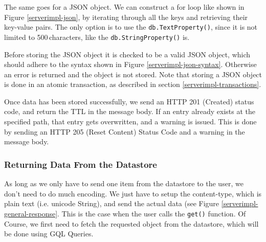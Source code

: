 The same goes for a JSON object. We can construct a for loop like shown in Figure
\ref{serverimpl-json}, by iterating through all the keys and retrieving their
key-value pairs. The only option is to use the \texttt{db.TextProperty()}, since
it is not limited to 500\,characters, like the \texttt{db.StringProperty()} is.

Before storing the JSON object it is checked to be a valid JSON object, which
should adhere to the syntax shown in Figure \ref{serverimpl-json-syntax}.
Otherwise an error is returned and the object is not stored. Note that storing a
JSON object is done in an atomic transaction, as described in section
\ref{serverimpl-transactions}.

Once data has been stored successfully, we send an HTTP 201 (Created) status
code, and return the TTL in the message body. If an entry already exists at the
specified path, that entry gets overwritten, and a warning is issued. This is
done by sending an HTTP 205 (Reset Content) Status Code and a warning in the
message body.

\begin{figure*}[ht] %
\begin{center}
\begin{code}
\end{code}
\caption{Advert syntax of a JSON object.\label{serverimpl-json-syntax}}
\end{center}
\end{figure*}


\subsubsection{Returning Data From the Datastore}
As long as we only have to send one item from the datastore to the user, we don't
need to do much encoding. We just have to setup the content-type, which is plain
text (i.e. unicode String), and send the actual data (see Figure
\ref{serverimpl-general-response}. This is the case when the user calls the
\texttt{get()} function. Of Course, we first need to fetch the requested object
from the datastore, which will be done using GQL Queries.

